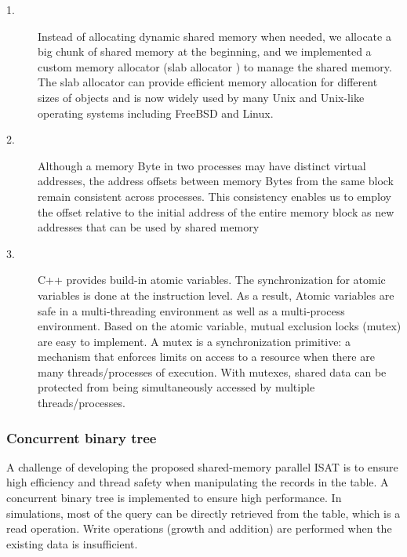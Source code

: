 \begin{description}
	\item [1.] Instead of allocating dynamic shared memory when needed, we allocate a big chunk of shared memory at the beginning, and we implemented a custom memory allocator (slab allocator \cite{bonwick1994slab}) to manage the shared memory. The slab allocator can provide efficient memory allocation for different sizes of objects and is now widely used by many Unix and Unix-like operating systems including FreeBSD and Linux.
	\item [2.] Although a memory Byte in two processes may have distinct virtual addresses, the address offsets between memory Bytes from the same block remain consistent across processes. This consistency enables us to employ the offset relative to the initial address of the entire memory block as new addresses that can be used by shared memory
	\item [3.] C++ provides build-in atomic variables. The synchronization for atomic variables is done at the instruction level. As a result, Atomic variables are safe in a multi-threading environment as well as a multi-process environment.
	      Based on the atomic variable, mutual exclusion locks (mutex) are easy to implement. A mutex is a synchronization primitive: a mechanism that enforces limits on access to a resource when there are many threads/processes of execution. With mutexes, shared data can be protected from being simultaneously accessed by multiple threads/processes.

\end{description}

%



\subsubsection{Concurrent binary tree}
A challenge of developing the proposed shared-memory parallel ISAT is to ensure high efficiency and thread safety when manipulating the records in the table. A concurrent binary tree is implemented to ensure high performance. In simulations, most of the query can be directly retrieved from the table, which is a read operation.
Write operations (growth and addition) are performed when the existing data is insufficient. %

